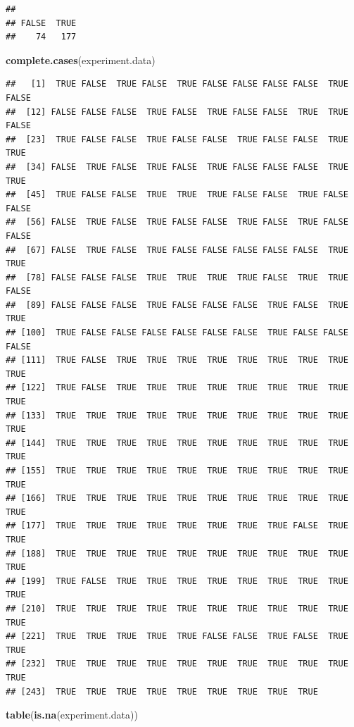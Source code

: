 \documentclass[]{book}
\newenvironment{Shaded}{\begin{snugshade}}{\end{snugshade}}
\newcommand{\KeywordTok}[1]{\textcolor[rgb]{0.13,0.29,0.53}{\textbf{#1}}}
\newcommand{\NormalTok}[1]{#1}
\theoremstyle{definition}
\theoremstyle{definition}
\theoremstyle{definition}
\theoremstyle{remark}
\begin{document}
\begin{verbatim}
## 
## FALSE  TRUE 
##    74   177
\end{verbatim}

\begin{Shaded}
\begin{Highlighting}[]
\KeywordTok{complete.cases}\NormalTok{(experiment.data)}
\end{Highlighting}
\end{Shaded}

\begin{verbatim}
##   [1]  TRUE FALSE  TRUE FALSE  TRUE FALSE FALSE FALSE FALSE  TRUE FALSE
##  [12] FALSE FALSE FALSE  TRUE FALSE  TRUE FALSE FALSE  TRUE  TRUE FALSE
##  [23]  TRUE FALSE FALSE  TRUE FALSE FALSE  TRUE FALSE FALSE  TRUE  TRUE
##  [34] FALSE  TRUE FALSE  TRUE FALSE  TRUE FALSE FALSE FALSE  TRUE  TRUE
##  [45]  TRUE FALSE FALSE  TRUE  TRUE  TRUE FALSE FALSE  TRUE FALSE FALSE
##  [56] FALSE  TRUE FALSE  TRUE FALSE FALSE  TRUE FALSE  TRUE FALSE FALSE
##  [67] FALSE  TRUE FALSE  TRUE FALSE FALSE FALSE FALSE FALSE  TRUE  TRUE
##  [78] FALSE FALSE FALSE  TRUE  TRUE  TRUE  TRUE FALSE  TRUE  TRUE FALSE
##  [89] FALSE FALSE FALSE  TRUE FALSE FALSE FALSE  TRUE FALSE  TRUE  TRUE
## [100]  TRUE FALSE FALSE FALSE FALSE FALSE FALSE  TRUE FALSE FALSE FALSE
## [111]  TRUE FALSE  TRUE  TRUE  TRUE  TRUE  TRUE  TRUE  TRUE  TRUE  TRUE
## [122]  TRUE FALSE  TRUE  TRUE  TRUE  TRUE  TRUE  TRUE  TRUE  TRUE  TRUE
## [133]  TRUE  TRUE  TRUE  TRUE  TRUE  TRUE  TRUE  TRUE  TRUE  TRUE  TRUE
## [144]  TRUE  TRUE  TRUE  TRUE  TRUE  TRUE  TRUE  TRUE  TRUE  TRUE  TRUE
## [155]  TRUE  TRUE  TRUE  TRUE  TRUE  TRUE  TRUE  TRUE  TRUE  TRUE  TRUE
## [166]  TRUE  TRUE  TRUE  TRUE  TRUE  TRUE  TRUE  TRUE  TRUE  TRUE  TRUE
## [177]  TRUE  TRUE  TRUE  TRUE  TRUE  TRUE  TRUE  TRUE FALSE  TRUE  TRUE
## [188]  TRUE  TRUE  TRUE  TRUE  TRUE  TRUE  TRUE  TRUE  TRUE  TRUE  TRUE
## [199]  TRUE FALSE  TRUE  TRUE  TRUE  TRUE  TRUE  TRUE  TRUE  TRUE  TRUE
## [210]  TRUE  TRUE  TRUE  TRUE  TRUE  TRUE  TRUE  TRUE  TRUE  TRUE  TRUE
## [221]  TRUE  TRUE  TRUE  TRUE  TRUE FALSE FALSE  TRUE FALSE  TRUE  TRUE
## [232]  TRUE  TRUE  TRUE  TRUE  TRUE  TRUE  TRUE  TRUE  TRUE  TRUE  TRUE
## [243]  TRUE  TRUE  TRUE  TRUE  TRUE  TRUE  TRUE  TRUE  TRUE
\end{verbatim}

\begin{Shaded}
\begin{Highlighting}[]
\KeywordTok{table}\NormalTok{(}\KeywordTok{is.na}\NormalTok{(experiment.data))}
\end{Highlighting}
\end{Shaded}
\end{document}
